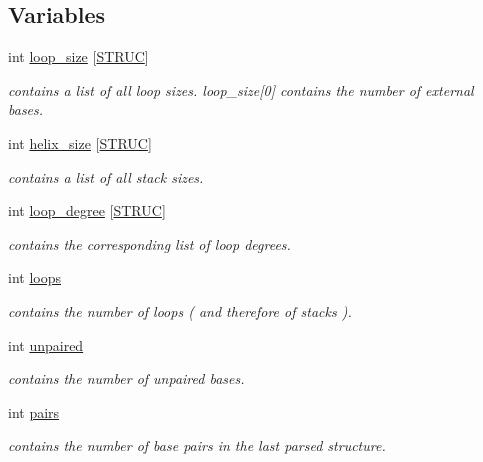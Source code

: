 \subsection*{Variables}
\begin{DoxyCompactItemize}
\item 
int \mbox{\hyperlink{group__struct__utils_ga3f31e0e48125601bfa57b52f8b038e8e}{loop\+\_\+size}} \mbox{[}\mbox{\hyperlink{group__struct__utils_gaa100f7d3ce0ad4f527a61c5764ebf277}{S\+T\+R\+UC}}\mbox{]}
\begin{DoxyCompactList}\small\item\em contains a list of all loop sizes. loop\+\_\+size\mbox{[}0\mbox{]} contains the number of external bases. \end{DoxyCompactList}\item 
int \mbox{\hyperlink{group__struct__utils_ga8218c0d581a3fba2a1a56a196abe19a5}{helix\+\_\+size}} \mbox{[}\mbox{\hyperlink{group__struct__utils_gaa100f7d3ce0ad4f527a61c5764ebf277}{S\+T\+R\+UC}}\mbox{]}
\begin{DoxyCompactList}\small\item\em contains a list of all stack sizes. \end{DoxyCompactList}\item 
int \mbox{\hyperlink{group__struct__utils_gaef14e2f8ab3f61e8e659ba6b9003b08a}{loop\+\_\+degree}} \mbox{[}\mbox{\hyperlink{group__struct__utils_gaa100f7d3ce0ad4f527a61c5764ebf277}{S\+T\+R\+UC}}\mbox{]}
\begin{DoxyCompactList}\small\item\em contains the corresponding list of loop degrees. \end{DoxyCompactList}\item 
int \mbox{\hyperlink{group__struct__utils_ga439fcb9f8d4f9f4d2227fde5fbfecb30}{loops}}
\begin{DoxyCompactList}\small\item\em contains the number of loops ( and therefore of stacks ). \end{DoxyCompactList}\item 
int \mbox{\hyperlink{group__struct__utils_gadd2f952597e02d66e1116a9d11d252d6}{unpaired}}
\begin{DoxyCompactList}\small\item\em contains the number of unpaired bases. \end{DoxyCompactList}\item 
int \mbox{\hyperlink{group__struct__utils_ga6341cbb704924824e0236c1dce791032}{pairs}}
\begin{DoxyCompactList}\small\item\em contains the number of base pairs in the last parsed structure. \end{DoxyCompactList}\end{DoxyCompactItemize}


